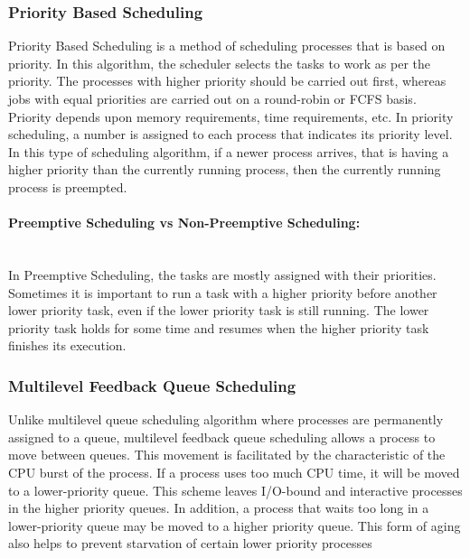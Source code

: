 \documentclass[10pt,twocolumn,letterpaper]{article}
\newcommand{\subsubsubsection}[1]{\paragraph{#1}\mbox{}\\}
\begin{document}
\subsubsection{Priority Based Scheduling}
Priority Based Scheduling is a method of scheduling processes that is based on priority. In this algorithm, the scheduler selects the tasks to work as per the priority. The processes with higher priority should be carried out first, whereas jobs with equal priorities are carried out on a round-robin or FCFS basis. Priority depends upon memory requirements, time requirements, etc. In priority scheduling, a number is assigned to each process that indicates its priority level. In this type of scheduling algorithm, if a newer process arrives, that is having a higher priority than the currently running process, then the currently running process is preempted.

\subsubsubsection{Preemptive Scheduling vs Non-Preemptive Scheduling:}
In Preemptive Scheduling, the tasks are mostly assigned with their priorities. Sometimes it is important to run a task with a higher priority before another lower priority task, even if the lower priority task is still running. The lower priority task holds for some time and resumes when the higher priority task finishes its execution.

\subsubsection{Multilevel Feedback Queue Scheduling}\cite{MLFQ}

Unlike multilevel queue scheduling algorithm where processes are permanently assigned to a queue, multilevel feedback queue scheduling allows a process to move between queues. This movement is facilitated by the characteristic of the CPU burst of the process. If a process uses too much CPU time, it will be moved to a lower-priority queue. This scheme leaves I/O-bound and interactive processes in the higher priority queues. In addition, a process that waits too long in a lower-priority queue may be moved to a higher priority queue. This form of aging also helps to prevent starvation of certain lower priority processes
\end{document}
